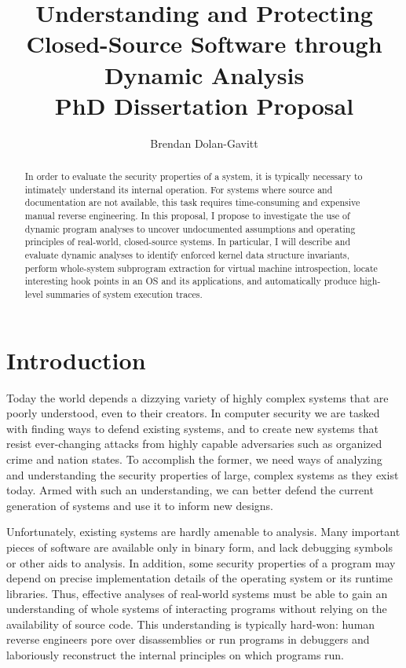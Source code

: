 \documentclass{article}
\title{Understanding and Protecting Closed-Source Software through Dynamic Analysis \\
\vspace {1em}
\large PhD Dissertation Proposal}
\author{Brendan Dolan-Gavitt}
\date{}
\begin{document}
\maketitle

\begin{abstract}

In order to evaluate the security properties of a system, it is
typically necessary to intimately understand its internal operation. For
systems where source and documentation are not available, this task
requires time-consuming and expensive manual reverse engineering. In
this proposal, I propose to investigate the use of dynamic program
analyses to uncover undocumented assumptions and operating principles of
real-world, closed-source systems. In particular, I will describe and
evaluate dynamic analyses to identify enforced kernel data structure
invariants, perform whole-system subprogram extraction for virtual
machine introspection, locate interesting hook points in an OS and its
applications, and automatically produce high-level summaries of system
execution traces.

\end{abstract}

\section {Introduction}

Today the world depends a dizzying variety of highly complex systems
that are poorly understood, even to their creators. In computer security
we are tasked with finding ways to defend existing systems, and to
create new systems that resist ever-changing attacks from highly capable
adversaries such as organized crime and nation states. To accomplish the
former, we need ways of analyzing and understanding the security
properties of large, complex systems as they exist today. Armed with
such an understanding, we can better defend the current generation of
systems and use it to inform new designs.

Unfortunately, existing systems are hardly amenable to analysis. Many
important pieces of software are available only in binary form, and lack
debugging symbols or other aids to analysis. In addition, some security
properties of a program may depend on precise implementation details of
the operating system or its runtime libraries. Thus, effective analyses
of real-world systems must be able to gain an understanding of whole
systems of interacting programs without relying on the availability of
source code. This understanding is typically hard-won: human reverse
engineers pore over disassemblies or run programs in debuggers and
laboriously reconstruct the internal principles on which programs run.
\end{document}
